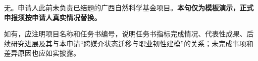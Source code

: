 \GXNSFBodyText

无。申请人此前未负责已结题的广西自然科学基金项目。\textbf{本句仅为模板演示，正式申报须按申请人真实情况替换。}

如有，应注明项目名称和任务书编号，说明任务书指标完成情况、代表性成果、后续研究进展及其与本申请“跨媒介状态迁移与职业韧性建模”的关系；未完成事项和差异原因也应如实披露。
